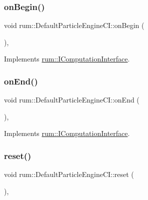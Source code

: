 \subsubsection{\texorpdfstring{on\+Begin()}{onBegin()}}
{\footnotesize\ttfamily void rum\+::\+Default\+Particle\+Engine\+C\+I\+::on\+Begin (\begin{DoxyParamCaption}{ }\end{DoxyParamCaption})\hspace{0.3cm}{\ttfamily [override]}, {\ttfamily [virtual]}}



Implements \mbox{\hyperlink{classrum_1_1_i_computation_interface_a17f23c01b55d0ad7e0a13cbfd35a592c}{rum\+::\+I\+Computation\+Interface}}.

\mbox{\label{classrum_1_1_default_particle_engine_c_i_ae478e3b581c3a6b306219c19552ff282}} 
\subsubsection{\texorpdfstring{on\+End()}{onEnd()}}
{\footnotesize\ttfamily void rum\+::\+Default\+Particle\+Engine\+C\+I\+::on\+End (\begin{DoxyParamCaption}{ }\end{DoxyParamCaption})\hspace{0.3cm}{\ttfamily [override]}, {\ttfamily [virtual]}}



Implements \mbox{\hyperlink{classrum_1_1_i_computation_interface_afaec27e8a634cd95cfc3aaa3e4664178}{rum\+::\+I\+Computation\+Interface}}.

\mbox{\label{classrum_1_1_default_particle_engine_c_i_a826fdf25ee18128e2fd0944e7771b387}} 
\subsubsection{\texorpdfstring{reset()}{reset()}}
{\footnotesize\ttfamily void rum\+::\+Default\+Particle\+Engine\+C\+I\+::reset (\begin{DoxyParamCaption}{ }\end{DoxyParamCaption})\hspace{0.3cm}{\ttfamily [override]}, {\ttfamily [virtual]}}



